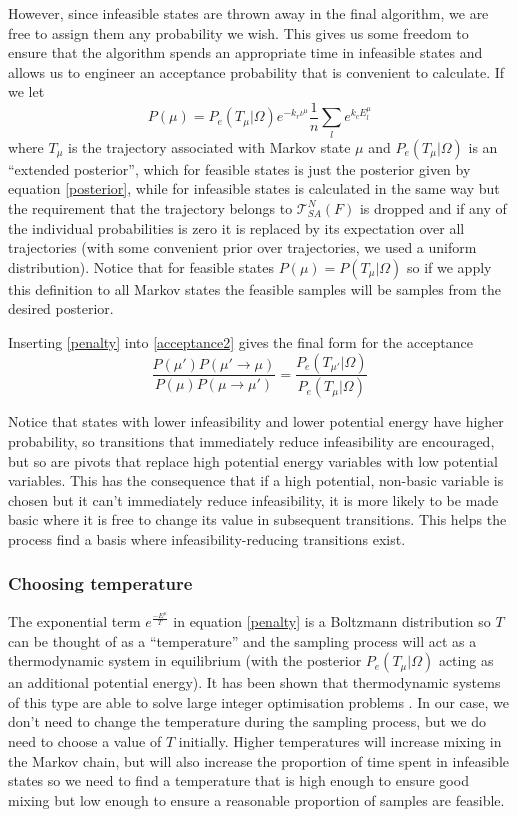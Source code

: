 \documentclass{article}
\begin{document}
However, since infeasible states are thrown away in the final algorithm, we are free to assign them any probability we wish. This gives us some freedom to ensure that the algorithm spends an appropriate time in infeasible states and allows us to engineer an acceptance probability that is convenient to calculate. If we let
\begin{equation}
P(\mu) = P_e(T_\mu|\Omega)e^{-k_r \iota^{\mu}} \frac{1}{n}  \sum_l e^{k_c E^\mu_l}
\label{penalty}
\end{equation}
where $T_\mu$ is the trajectory associated with Markov state $\mu$ and $P_e(T_\mu|\Omega)$ is an ``extended posterior'', which for feasible states is just the posterior given by equation \eqref{posterior}, while for infeasible states is calculated in the same way but the requirement that the trajectory belongs to $\mathcal{T}^N_{SA}(F)$ is dropped and if any of the individual probabilities is zero it is replaced by its expectation over all trajectories (with some convenient prior over trajectories, we used a uniform distribution). Notice that for feasible states $P(\mu) = P(T_\mu|\Omega)$ so if we apply this definition to all Markov states the feasible samples will be samples from the desired posterior.

Inserting \eqref{penalty} into \eqref{acceptance2} gives the final form for the acceptance
\begin{equation}
\frac{P(\mu')P(\mu'\to\mu)}{P(\mu)P(\mu\to\mu')} 
=
\frac{P_e(T_{\mu'}|\Omega)}{P_e(T_\mu|\Omega)}
\end{equation}

Notice that states with lower infeasibility and lower potential energy have higher probability, so transitions that immediately reduce infeasibility are encouraged, but so are pivots that replace high potential energy variables with low potential variables. This has the consequence that if a high potential, non-basic variable is chosen but it can't immediately reduce infeasibility, it is more likely to be made basic where it is free to change its value in subsequent transitions. This helps the process find a basis where infeasibility-reducing transitions exist.

\subsubsection{Choosing temperature}
The exponential term $e^{\frac{-E^\mu}{T}}$ in equation \eqref{penalty} is a Boltzmann distribution so $T$ can be thought of as a ``temperature'' and the sampling process will act as a thermodynamic system in equilibrium (with the posterior $P_e(T_\mu|\Omega)$ acting as an additional potential energy).  It has been shown that thermodynamic systems of this type are able to solve large integer optimisation problems \cite{kirkpatrick1983optimization}. In our case, we don't need to change the temperature during the sampling process, but we do need to choose a value of $T$ initially. Higher temperatures will increase mixing in the Markov chain, but will also increase the proportion of time spent in infeasible states so we need to find a temperature that is high enough to ensure good mixing but low enough to ensure a reasonable proportion of samples are feasible.
\end{document}
